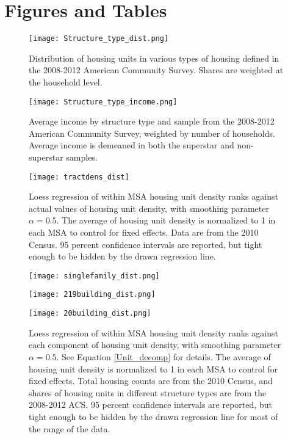 \documentclass[]{article}
\theoremstyle{plain}
\begin{document}
\newpage
\clearpage
\scriptsize



\newpage
\appendix
\section{Figures and Tables}\label{figuresappendix}
\begin{center}
	\begin{figure}[htbp!]
		\texttt{[image: Structure\_type\_dist.png]}
		\caption{Distribution of housing units in various types of housing defined in the 2008-2012 American Community Survey. Shares are weighted at the household level.}
		\label{structure_distribution}
	\end{figure}
\end{center}
\begin{center}
	\begin{figure}[htbp!]
		\texttt{[image: Structure\_type\_income.png]}
		\caption{Average income by structure type and sample from the 2008-2012 American Community Survey, weighted by number of households. Average income is demeaned in both the superstar and non-superstar samples. }
		\label{structure_income}
	\end{figure}
\end{center}

\begin{center}
	\begin{figure}[htbp!]
		\texttt{[image: tractdens\_dist]}
		\caption{Loess regression of within MSA housing unit density ranks against actual values of housing unit density, with smoothing parameter $\alpha = 0.5$. The average of housing unit density is normalized to 1 in each MSA to control for fixed effects. Data are from the 2010 Census. 95 percent confidence intervals are reported, but tight enough to be hidden by the drawn regression line.}
		\label{tractdens_dist}
	\end{figure}
\end{center}

\begin{figure}[htbp!]
	\vspace{-2cm}
	\centerline{	\texttt{[image: singlefamily\_dist.png]}}
	\centerline{	
	\texttt{[image: 219building\_dist.png]}}
	\centerline{	
	\texttt{[image: 20building\_dist.png]}}
		\caption{Loess regression of within MSA housing unit density ranks against each component of housing unit density, with smoothing parameter $\alpha = 0.5$. See Equation \eqref{Unit_decomp} for details. The average of housing unit density is normalized to 1 in each MSA to control for fixed effects. Total housing counts are from the 2010 Census, and shares of housing units in different structure types are from the 2008-2012 ACS. 95 percent confidence intervals are reported, but tight enough to be hidden by the drawn regression line for most of the range of the data.}
		\label{tractdens_decomp}
	\end{figure}		
\newpage
\end{document}
